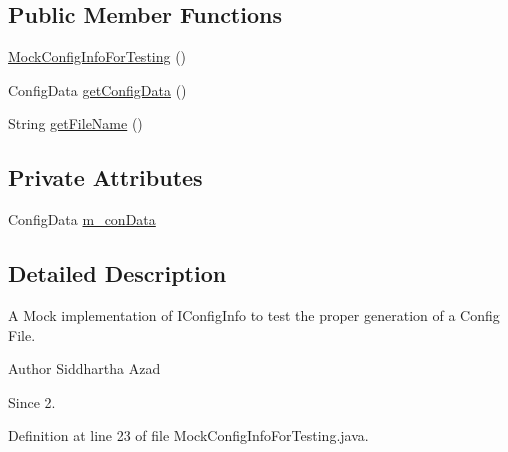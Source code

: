 \subsection*{Public Member Functions}
\begin{DoxyCompactItemize}
\item 
\hyperlink{classorg_1_1jgap_1_1gui_1_1_mock_config_info_for_testing_aa893172192a23d52f7b03bb2666c920b}{Mock\-Config\-Info\-For\-Testing} ()
\item 
Config\-Data \hyperlink{classorg_1_1jgap_1_1gui_1_1_mock_config_info_for_testing_a38ec21e1623bde6cd319b1160df398e8}{get\-Config\-Data} ()
\item 
String \hyperlink{classorg_1_1jgap_1_1gui_1_1_mock_config_info_for_testing_a7bbfb6be1075e9476d04ccf5b2cd90e2}{get\-File\-Name} ()
\end{DoxyCompactItemize}
\subsection*{Private Attributes}
\begin{DoxyCompactItemize}
\item 
Config\-Data \hyperlink{classorg_1_1jgap_1_1gui_1_1_mock_config_info_for_testing_af80b38e67db64eafba78da41c7c453b7}{m\-\_\-con\-Data}
\end{DoxyCompactItemize}


\subsection{Detailed Description}
A Mock implementation of I\-Config\-Info to test the proper generation of a Config File.

\begin{DoxyAuthor}{Author}
Siddhartha Azad 
\end{DoxyAuthor}
\begin{DoxySince}{Since}
2. 
\end{DoxySince}


Definition at line 23 of file Mock\-Config\-Info\-For\-Testing.\-java.



